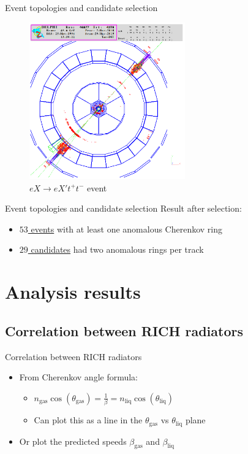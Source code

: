 \documentclass{beamer}
\begin{document}
\begin{frame}{Event topologies and candidate selection}
  \begin{figure}
    \centering
    \includegraphics[width = 0.6\textwidth]{Topology3.png}
    \caption{$eX\to eX't^+t^-$ event}
  \end{figure}
\end{frame}

\begin{frame}{Event topologies and candidate selection}
  Result after selection:
  \vspace{0.6cm}
  \begin{itemize}
    \setlength\itemsep{1.5em}
    \item{\underline{$53$ events} with at least one anomalous Cherenkov ring}
    \item{\underline{$29$ candidates} had two anomalous rings per track}
  \end{itemize}
\end{frame}

\section{Analysis results}
\subsection{Correlation between RICH radiators}
\begin{frame}{Correlation between RICH radiators}
  \begin{itemize}
    \setlength\itemsep{2.5em}
    \item{From Cherenkov angle formula:}
    \begin{itemize}
      \setlength\itemsep{0.5em}
      \item{$n_\text{gas}\cos(\theta_\text{gas}) = \frac{1}{\beta} = n_\text{liq}\cos(\theta_\text{liq})$}
      \item{Can plot this as a line in the $\theta_\text{gas}$ vs $\theta_\text{liq}$ plane}
    \end{itemize}
    \item{Or plot the predicted speeds $\beta_\text{gas}$ and $\beta_\text{liq}$}
  \end{itemize}
\end{frame}
\end{document}
